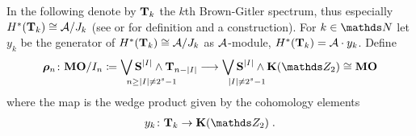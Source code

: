 \begin{Def*}
  In the following denote by $\bm{\mathrm{T}}{}_{k}$ the $k$th
  Brown-Gitler spectrum, thus especially
  $H^*(\bm{\mathrm{T}}{}_{k})\cong\mathcal{A}/J_{k}$
  (see \cite{browngitler} or \cite[p.~101]{immersionconj} for
  definition and a construction).
  For $k\in\Nat$ let $y_k$ be the generator of
  $H^*(\bm{\mathrm{T}}{}_{k})\cong \mathcal{A}/J_{k}$ as $\mathcal{A}$-module,
  \idest $H^*(\bm{\mathrm{T}}{}_{k})=\mathcal{A}\cdot y_k$.
  Define
  \begin{gather*}
    \bm{\rho}_n\colon
    \MOmodI n
    \coloneqq \bigvee_{\mathrlap{n\geq\Deg{I}\neq 2^s-1}}
    \Spherespec{\Deg{I}} \smashprod \BrownGitler{n-\Deg{I}}
    \longto
    \bigvee_{\mathrlap{\Deg{I}\neq 2^s-1}}
    \Spherespec{\Deg{I}} \smashprod \EMspec
    \cong \MOspec
  \end{gather*}
  where the map is the wedge product given by the cohomology elements
  \begin{gather*}
    y_k\colon\BrownGitler k \to \EMspec
    \;.
  \end{gather*}
\end{Def*}


